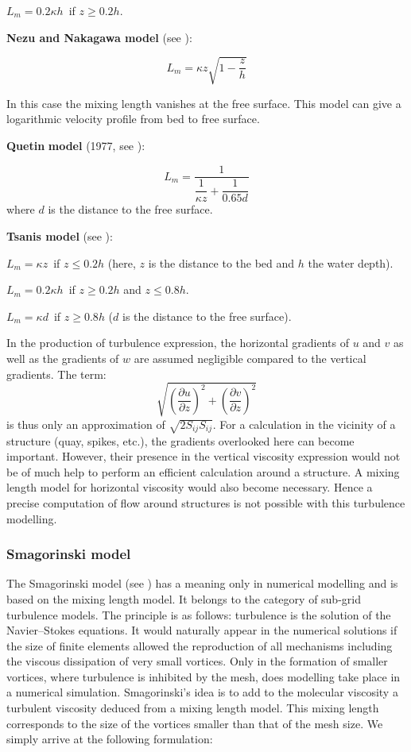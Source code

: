 $L_{m}=0.2\kappa h$\ if $z\geq0.2h$.

\textbf{Nezu and Nakagawa model} (see \cite{nezu93}):%

\[
L_{m}=\kappa z\sqrt{1-\dfrac{z}{h}}%
\]


In this case the mixing length vanishes at the free surface. This model can
give a logarithmic velocity profile from bed to free surface.

\textbf{Quetin} \textbf{model} (1977, see \cite{quetin77}):%
%
%

\[
L_{m}=\dfrac{1}{\dfrac{1}{\kappa z}+\dfrac{1}{0.65d}}%
\]
where $d$ is the distance to the free surface.

\textbf{Tsanis model} (see \cite{tsanis89}):%
%


$L_{m}=\kappa z$\ if $z\leq0.2h$ (here, $z$ is the distance to the bed and
$h$ the water depth).

$L_{m}=0.2\kappa h$\ if $z\geq0.2h$ and $z\leq0.8h$.

$L_{m}=\kappa d$\ if $z\geq0.8h$ ($d$ is the distance to the free surface).

In the production of turbulence expression, the horizontal gradients of $u$
and $v$ as well as the gradients of $w$ are assumed negligible compared to the
vertical gradients. The term:
\[
\sqrt{\left(  \dfrac{\partial u}{\partial z}\right)  ^{2}+\left(
    \dfrac{\partial v}{\partial z}\right)  ^{2}}%
\]
is thus only an approximation of $\sqrt{2S_{ij}S_{ij}}$. For a calculation in
the vicinity of a structure (quay, spikes, etc.), the gradients overlooked
here can become important. However, their presence in the vertical viscosity
expression would not be of much help to perform an efficient calculation
around a structure. A mixing length model for horizontal viscosity would also
become necessary. Hence a precise computation of flow around structures is not
possible with this turbulence modelling.%



\subsubsection{\label{smagorinski}Smagorinski model%
}

The Smagorinski model (see \cite{smagorinski63}) has a meaning only in
numerical modelling and is based on the mixing length model. It belongs to the
category of sub-grid turbulence models. The principle is as follows:
turbulence is the solution of the Navier--Stokes equations. It would naturally
appear in the numerical solutions if the size of finite elements allowed the
reproduction of all mechanisms including the viscous dissipation of very small
vortices. Only in the formation of smaller vortices, where turbulence is
inhibited by the mesh, does modelling take place in a numerical simulation.
Smagorinski's idea is to add to the molecular viscosity a turbulent viscosity
deduced from a mixing length model. This mixing length corresponds to the size
of the vortices smaller than that of the mesh size. We simply arrive at the
following formulation:%

